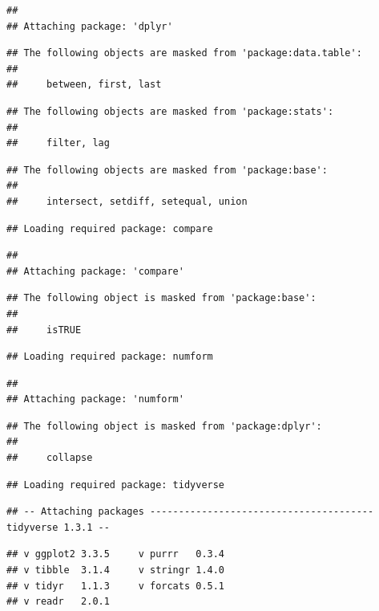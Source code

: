 \documentclass[
]{book}
\begin{document}
\begin{verbatim}
## 
## Attaching package: 'dplyr'
\end{verbatim}

\begin{verbatim}
## The following objects are masked from 'package:data.table':
## 
##     between, first, last
\end{verbatim}

\begin{verbatim}
## The following objects are masked from 'package:stats':
## 
##     filter, lag
\end{verbatim}

\begin{verbatim}
## The following objects are masked from 'package:base':
## 
##     intersect, setdiff, setequal, union
\end{verbatim}

\begin{verbatim}
## Loading required package: compare
\end{verbatim}

\begin{verbatim}
## 
## Attaching package: 'compare'
\end{verbatim}

\begin{verbatim}
## The following object is masked from 'package:base':
## 
##     isTRUE
\end{verbatim}

\begin{verbatim}
## Loading required package: numform
\end{verbatim}

\begin{verbatim}
## 
## Attaching package: 'numform'
\end{verbatim}

\begin{verbatim}
## The following object is masked from 'package:dplyr':
## 
##     collapse
\end{verbatim}

\begin{verbatim}
## Loading required package: tidyverse
\end{verbatim}

\begin{verbatim}
## -- Attaching packages --------------------------------------- tidyverse 1.3.1 --
\end{verbatim}

\begin{verbatim}
## v ggplot2 3.3.5     v purrr   0.3.4
## v tibble  3.1.4     v stringr 1.4.0
## v tidyr   1.1.3     v forcats 0.5.1
## v readr   2.0.1
\end{verbatim}
\end{document}
